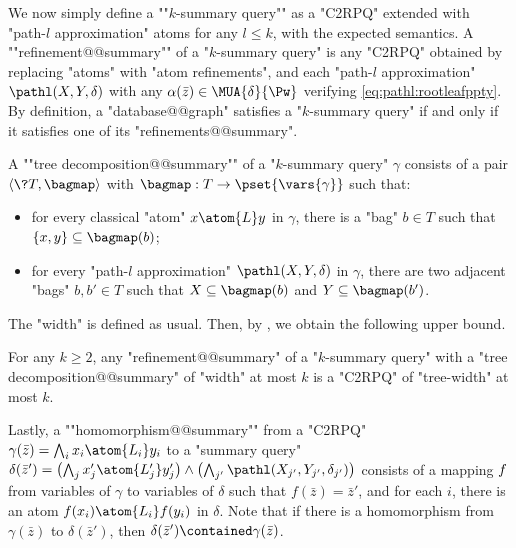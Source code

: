 \AP We now simply define a ""$k$-summary query"" as a "C2RPQ" extended with "path-$l$ approximation" atoms for any $l\leq k$, with the expected semantics.
A \AP""refinement@@summary"" of a "$k$-summary query" is any "C2RPQ" obtained by
replacing "atoms" with "atom refinements", and 
each "path-$l$ approximation" $\pathl(X, Y, \delta)$ with any
$\alpha(\bar z) \in \MUA{\delta}{\Pw}$ verifying \eqref{eq:pathl:rootleafppty}. By definition,
a "database@@graph" satisfies a "$k$-summary query" if and only if it
satisfies one of its "refinements@@summary".

A \AP ""tree decomposition@@summary"" of a "$k$-summary query" $\gamma$ consists of
a pair $\tup{\?T, \bagmap}$ with $\bagmap: T \to \pset{\vars{\gamma}}$
such that:
\begin{itemize}
	\item for every classical "atom" $x \atom{L} y$ in $\gamma$,
		there is a "bag" $b \in T$ such that $\{x,y\} \subseteq \bagmap(b)$;
	\item for every "path-$l$ approximation" $\pathl(X, Y, \delta)$ in $\gamma$,
		there are two adjacent "bags" $b, b' \in T$ such that $X \subseteq \bagmap(b)$
		and $Y \subseteq \bagmap(b')$.
\end{itemize}
The "width" is defined as usual. Then, by
, we obtain the following upper bound.

\begin{fact}
	\AP\label{fact:tree-width-summary}
	For any $k\geq 2$, any "refinement@@summary" of a "$k$-summary query" with
	a "tree decomposition@@summary" of "width" at most $k$ is a "C2RPQ" of "tree-width" at most $k$.
\end{fact}

Lastly, a \AP""homomorphism@@summary"" from a "C2RPQ"
$\gamma(\bar z) = \bigwedge_{i} x_i \atom{L_i} y_i$
to a "summary query" $\delta(\bar z') =
\bigl( \bigwedge_{j} x'_j \atom{L'_j} y'_j \bigr)
\wedge \bigl( \bigwedge_{j'} \pathl(X_{j'}, Y_{j'}, \delta_{j'}) \bigr)$
consists of a mapping $f$ from variables of $\gamma$ to variables of $\delta$
such that $f(\bar z) = \bar z'$, and for each $i$,
there is an atom $f(x_i) \atom{L_i} f(y_i)$ in $\delta$.
Note that if there is a homomorphism from $\gamma(\bar z)$ to $\delta(\bar z')$,
then $\delta(\bar z') \contained \gamma(\bar z)$.


